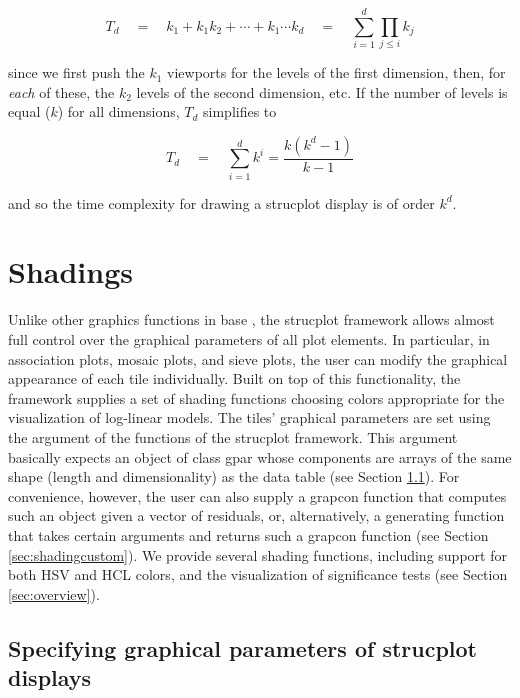 \documentclass{Z}
\newcommand{\class}[1]{\textsf{#1}}
\begin{document}
\begin{equation}
  \label{eq:numbervp}
  T_d \quad = \quad k_1 + k_1k_2 + \cdots + k_1 \cdots k_d \quad =\quad \sum_{i=1}^d \prod_{j \le i} k_j
\end{equation}

\noindent since we first push the $k_1$ viewports for the levels of the
first dimension, then, for \emph{each} of these, the $k_2$ levels of
the second dimension, etc. If the number of levels is equal ($k$) for
all dimensions, $T_d$ simplifies to

\begin{equation}
  \label{eq:equalvp}
  T_d \quad = \quad \sum_{i=1}^d k^i = \frac{k(k^d-1)}{k-1}
\end{equation}

\noindent and so the time complexity for drawing a strucplot display is of order $k^d$.

\section{Shadings}
\label{sec:shading}


Unlike other graphics functions in base , the strucplot framework 
allows almost full control over the graphical parameters of all plot elements. In
particular, in association plots, mosaic plots, and sieve plots, 
the user can modify the graphical appearance of each tile individually. 
Built on top of this functionality, the
framework supplies a set of shading functions choosing colors
appropriate for the visualization of log-linear models.
The tiles' graphical parameters are set using the  argument
of the functions of the strucplot framework. This argument basically expects an object
of class \class{gpar} whose components are arrays of the same shape 
(length and dimensionality) as the data table (see Section \ref{sec:gp}). 
For convenience, however, the user can also
supply a grapcon function that computes such an object given a vector of
residuals, or, alternatively, a generating function that takes
certain arguments and returns such a grapcon function (see Section
\ref{sec:shadingcustom}). We provide several shading functions, including
support for both HSV and HCL colors, and the
visualization of significance tests (see Section \ref{sec:overview}).

\subsection{Specifying graphical parameters of strucplot displays}
\label{sec:gp}
\end{document}
